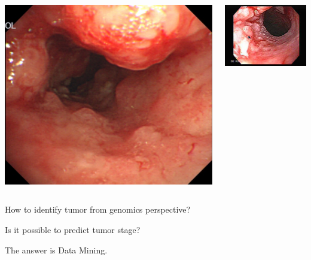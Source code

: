 \documentclass[UTF8]{beamer}\usepackage[]{graphicx}\usepackage[]{color}
\begin{document}
\begin{frame}
  \begin{columns}
\begin{column}{.5\textwidth}
  \includegraphics[width=\textwidth]{escc.jpg}
\end{column}
\begin{column}{.5\textwidth}
  \includegraphics[width=\textwidth]{esccNormal.jpg}
\end{column}
\end{columns}

\centerline{How to identify tumor from genomics perspective?}
\centerline{Is it possible to predict tumor stage?}

\centerline{\huge{The answer is Data Mining.}}
\end{frame}
\end{document}
